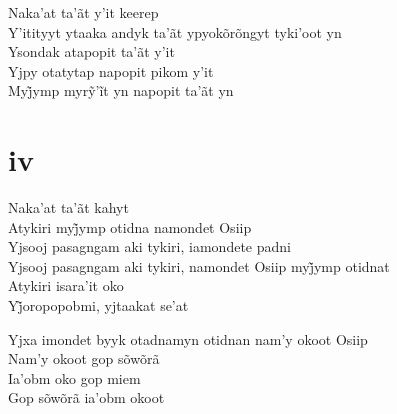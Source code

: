 \begin{linenumbers}\begingroup\raggedright
 
\noindent   Naka'at ta'ãt y'it keerep\\
  Y'itityyt ytaaka andyk ta'ãt ypyokõrõngyt tyki'oot yn\\
  Ysondak atapopit ta'ãt y'it\\
  Yjpy otatytap napopit pikom y'it\\
  Myj̃ymp myrỹ’ĩt yn napopit ta’ãt yn
 
 
\medskip
\section{iv}

  \noindent Naka'at ta'ãt kahyt\\
  Atykiri myj̃ymp otidna namondet Osiip\\
  Yjsooj pasagngam aki tykiri, iamondete padni\\
  Yjsooj pasagngam aki tykiri, namondet Osiip myj̃ymp otidnat\\
  Atykiri isara'it oko\\
  Yj̃oropopobmi, yjtaakat se’at
 
\end{linenumbers}\endgroup

\bigskip

\begin{linenumbers}\begingroup\raggedright
 
\noindent   Yjxa imondet byyk otadnamyn otidnan nam'y okoot Osiip\\
  Nam'y okoot gop sõwõrã\\
  Ia'obm oko gop miem\\
  Gop sõwõrã ia'obm okoot
 
\end{linenumbers}\endgroup

